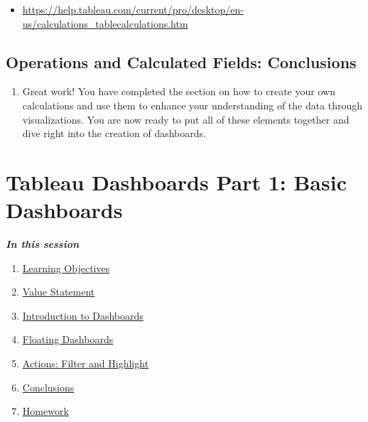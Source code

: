 \documentclass[
]{book}
\providecommand{\tightlist}{%
  \setlength{\itemsep}{0pt}\setlength{\parskip}{0pt}}
\begin{document}
\begin{enumerate}
  \begin{itemize}
  \tightlist
  \item
    \url{https://help.tableau.com/current/pro/desktop/en-us/calculations_tablecalculations.htm}
  \end{itemize}
\end{enumerate}

\hypertarget{operations-and-calculated-fields-conclusions}{%
\subsection{Operations and Calculated Fields: Conclusions}\label{operations-and-calculated-fields-conclusions}}

\begin{enumerate}
\def\labelenumi{\arabic{enumi}.}
\tightlist
\item
  Great work! You have completed the section on how to create your own calculations and use them to enhance your understanding of the data through visualizations. You are now ready to put all of these elements together and dive right into the creation of dashboards.
\end{enumerate}

\hypertarget{tableau-dashboards-part-1-basic-dashboards}{%
\section{Tableau Dashboards Part 1: Basic Dashboards}\label{tableau-dashboards-part-1-basic-dashboards}}

\textbf{\emph{In this session}}

\begin{enumerate}
\def\labelenumi{\arabic{enumi}.}
\tightlist
\item
  \protect\hyperlink{basic-dashboards-learning-objectives}{Learning Objectives}
\item
  \protect\hyperlink{basic-dashboards-value-statement}{Value Statement}
\item
  \protect\hyperlink{introduction-to-dashboards}{Introduction to Dashboards}
\item
  \protect\hyperlink{floating-dashboards}{Floating Dashboards}
\item
  \protect\hyperlink{actions-filter-and-highlight}{Actions: Filter and Highlight}
\item
  \protect\hyperlink{basic-dashboards-conclusions}{Conclusions}
\item
  \protect\hyperlink{basic-dashboards-homework}{Homework}
\end{enumerate}
\end{document}
